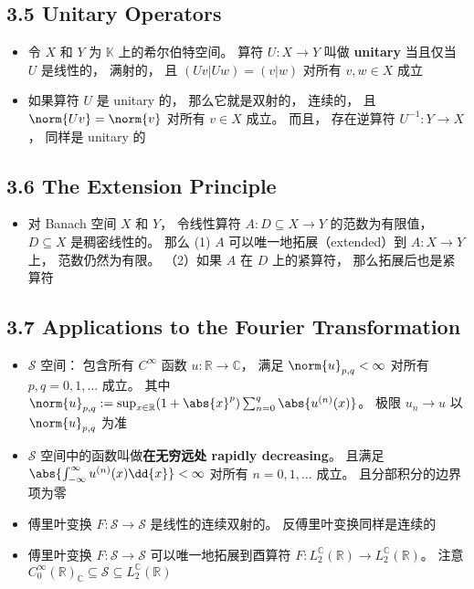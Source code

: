 \subsection{3.5 Unitary Operators}
\begin{itemize}
\item 令 $X$ 和 $Y$ 为 $\mathbb K$ 上的希尔伯特空间。 算符 $U: X\to Y$ 叫做 \textbf{unitary} 当且仅当 $U$ 是线性的， 满射的， 且 $(Uv|Uw) = (v|w)$ 对所有 $v, w \in X$ 成立

\item 如果算符 $U$ 是 unitary 的， 那么它就是双射的， 连续的， 且 $\norm{Uv} = \norm{v}$ 对所有 $v\in X$ 成立。 而且， 存在逆算符 $U^{-1}: Y\to X$， 同样是 unitary 的
\end{itemize}

\subsection{3.6 The Extension Principle}
\begin{itemize}
\item 对 Banach 空间 $X$ 和 $Y$， 令线性算符 $A: D\subseteq X\to Y$ 的范数为有限值， $D \subseteq X$ 是稠密线性的。 那么 (1) $A$ 可以唯一地拓展（extended）到 $A:X\to Y$ 上， 范数仍然为有限。 （2）如果 $A$ 在 $D$ 上的紧算符， 那么拓展后也是紧算符
\end{itemize}

\subsection{3.7 Applications to the Fourier Transformation}
\begin{itemize}
\item $\mathcal S$ 空间： 包含所有 $C^\infty$ 函数 $u: \mathbb R \to \mathbb C$， 满足 $\norm{u}_{p,q} < \infty$ 对所有 $p, q=0,1,\dots$ 成立。 其中 $\norm{u}_{p,q} := \sup_{x\in\mathbb R} (1+\abs{x}^p) \sum_{n=0}^q\abs{u^{(n)}(x)}$。 极限 $u_n \to u$ 以 $\norm{u}_{p,q}$ 为准

\item $\mathcal S$ 空间中的函数叫做\textbf{在无穷远处 rapidly decreasing}。 且满足 $\abs{\int_{-\infty}^\infty u^{(n)}(x) \dd{x}} < \infty$ 对所有 $n = 0, 1,\dots$ 成立。 且分部积分的边界项为零

\item 傅里叶变换 $F:\mathcal S\to\mathcal S$ 是线性的连续双射的。 反傅里叶变换同样是连续的

\item 傅里叶变换 $F:\mathcal S\to\mathcal S$ 可以唯一地拓展到酉算符 $F: L_2^{\mathbb C}(\mathbb R) \to L_2^{\mathbb C}(\mathbb R)$。 注意 $C_0^\infty(\mathbb R)_{\mathbb C} \subseteq \mathcal S \subseteq L_2^{\mathbb C}(\mathbb R)$
\end{itemize}


